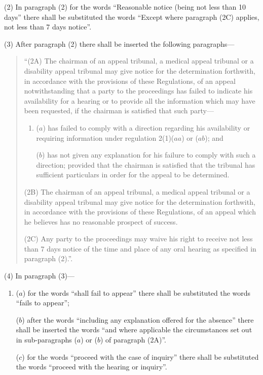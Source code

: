 \documentclass[a4paper]{article}
\begin{document}
(2) In paragraph (2) for the words “Reasonable notice (being not less than 10 days” there shall be substituted the words “Except where paragraph (2C) applies, not less than 7 days notice”.

(3) After paragraph (2) there shall be inserted the following paragraphs—
\begin{quotation}
“(2A) The chairman of an appeal tribunal, a medical appeal tribunal or a disability appeal tribunal may give notice for the determination forthwith, in accordance with the provisions of these Regulations, of an appeal notwithstanding that a party to the proceedings has failed to indicate his availability for a hearing or to provide all the information which may have been requested, if the chairman is satisfied that such party—
\begin{enumerate}\item[]
($a$) has failed to comply with a direction regarding his availability or requiring information under regulation 2(1)($aa$) or ($ab$); and

($b$) has not given any explanation for his failure to comply with such a direction; provided that the chairman is satisfied that the tribunal has sufficient particulars in order for the appeal to be determined.
\end{enumerate}

(2B) The chairman of an appeal tribunal, a medical appeal tribunal or a disability appeal tribunal may give notice for the determination forthwith, in accordance with the provisions of these Regulations, of an appeal which he believes has no reasonable prospect of success.

(2C) Any party to the proceedings may waive his right to receive not less than 7 days notice of the time and place of any oral hearing as specified in paragraph (2).”.
\end{quotation}

(4) In paragraph (3)—
\begin{enumerate}\item[]
($a$) for the words “shall fail to appear” there shall be substituted the words “fails to appear”;

($b$) after the words “including any explanation offered for the absence” there shall be inserted the words “and where applicable the circumstances set out in sub-paragraphs ($a$) or ($b$) of paragraph (2A)”.

($c$) for the words “proceed with the case of inquiry” there shall be substituted the words “proceed with the hearing or inquiry”.
\end{enumerate}
\end{document}
